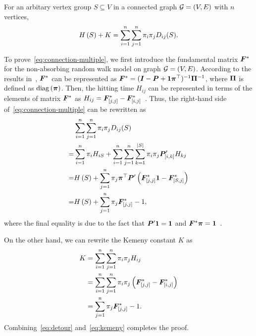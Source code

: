 \documentclass[10pt,twocolumn,twoside]{IEEEtran}
\begin{document}
\begin{theorem}\label{thm:connection-multiple}
    For an arbitary vertex group \(S\subseteq V\) in a connected graph \(\mathcal{G}=(V,E)\) with \(n\) vertices,
    \begin{equation}\label{eq:connection-multiple}
        H\left(S\right)+K=\sum_{i=1}^n\sum_{j=1}^n\pi_i\pi_jD_{ij}(S).
    \end{equation}
\end{theorem}
\begin{IEEEproof}
    To prove~\eqref{eq:connection-multiple}, we first introduce the fundamental matrix \(\boldsymbol{F}^*\) for the non-absorbing random walk model on graph  \(\mathcal{G}=(V,E)\).
    According to the results in~\cite{BoRaZh11}, \(\boldsymbol{F}^*\) can be represented as \(\boldsymbol{F}^*=(\boldsymbol{I}-\boldsymbol{P}+\boldsymbol{1}\boldsymbol{\pi}^\top)^{-1}\boldsymbol{\Pi}^{-1}\), where \(\boldsymbol{\Pi}\) is defined as \(\rm{diag}\left( \boldsymbol{\pi} \right)\).
    Then, the hitting time \(H_{ij}\) can be represented in terms of the elements of matrix \(\boldsymbol{F}^*\) as \(H_{ij}=\boldsymbol{F}^*_{[j,j]}-\boldsymbol{F}^*_{[i,j]}\)~\cite{BoRaZh11}. Thus, the right-hand side of~\eqref{eq:connection-multiple} can be rewritten as
    \begin{equation}\label{eq:detour}
        \begin{split}
            &\sum_{i=1}^n\sum_{j=1}^n\pi_i\pi_jD_{ij}(S)\\
            =&\sum_{i=1}^n\pi_i H_{iS}+\sum_{i=1}^n\sum_{j=1}^n\sum_{k=1}^{\left|S \right|}\pi_i\pi_j\boldsymbol{P}'_{[i,k]}H_{kj}  \\
            =&H\left(S\right)+\sum_{j=1}^n\pi_j\boldsymbol{\pi}^\top\boldsymbol{P}'\left( \boldsymbol{F}^*_{[j,j]}\boldsymbol{1}-\boldsymbol{F}^*_{[S,j]} \right)                        \\
            =&H\left(S\right)+\sum_{j=1}^n\pi_j\boldsymbol{F}^*_{[j,j]}-1,
        \end{split}
    \end{equation}
    where the final equality is due to the fact that \(\boldsymbol{P}'\boldsymbol{1}=\boldsymbol{1}\) and \(\boldsymbol{F}^*\boldsymbol{\pi}=\boldsymbol{1}\)~\cite{BoRaZh11}.

    On the other hand, we can rewrite the Kemeny constant \(K\) as    \begin{equation}\label{eq:kemeny}
        \begin{split}
            K&=\sum_{i=1}^n\sum_{j=1}^n\pi_i\pi_jH_{ij}\\
            &=\sum_{i=1}^n\sum_{j=1}^n\pi_i\pi_j\left( \boldsymbol{F}^*_{[j,j]}-\boldsymbol{F}^*_{[i,j]} \right)\\
            &=\sum_{j=1}^n\pi_j\boldsymbol{F}^*_{[j,j]}-1.
        \end{split}
    \end{equation}
    Combining~\eqref{eq:detour} and~\eqref{eq:kemeny} completes the proof.
\end{IEEEproof}
\end{document}

